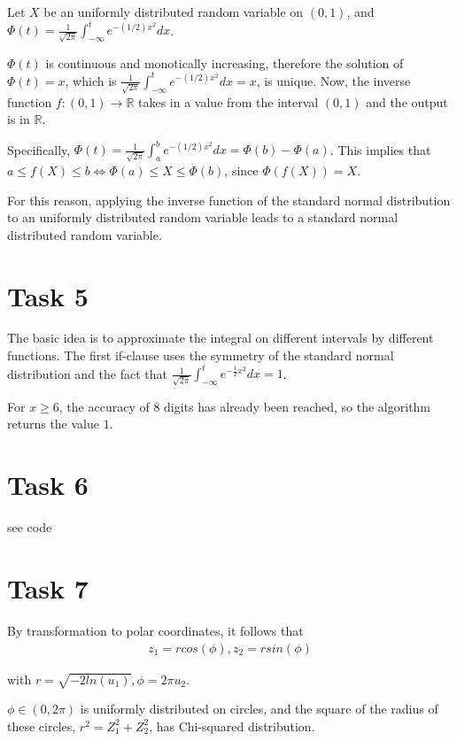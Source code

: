 \documentclass[10pt,a4paper]{article}
\begin{document}
Let $X$ be an uniformly distributed random variable on $(0,1)$, and $\Phi(t)=\frac{1}{\sqrt{2 \pi}}\int_{-\infty}^{t}e^{-(1/2)x^2}dx$.
 
$\Phi(t)$ is continuous and monotically increasing, therefore the solution of $\Phi(t)=x$, which is $\frac{1}{\sqrt{2 \pi}}\int_{-\infty}^{t}e^{-(1/2)x^2}dx=x$, is unique. Now, the inverse function $f:(0,1)\rightarrow \mathbb{R}$ takes in a value from the interval $(0,1)$ and the output is in $\mathbb{R}$.

Specifically, $\Phi(t)=\frac{1}{\sqrt{2 \pi}}\int_{a}^{b}e^{-(1/2)x^2}dx=\Phi(b)-\Phi(a)$. This implies that $a\leq f(X) \leq b \Leftrightarrow \Phi(a)\leq X \leq \Phi(b)$, since $\Phi(f(X))=X$.

For this reason, applying the inverse function of the standard normal distribution to an uniformly distributed random variable leads to a standard normal distributed random variable.  

\section*{Task 5}

The basic idea is to approximate the integral on different intervals by different functions. The first if-clause uses the symmetry of the standard normal distribution and the fact that $\frac{1}{\sqrt{2 \pi}}\int_{-\infty}^{t}e^{-\frac{1}{2}x^2}dx=1$. 

For $x\geq 6$, the accuracy of $8$ digits has already been reached, so the algorithm returns the value $1$.

\section*{Task 6}

see code

\section*{Task 7}

By transformation to polar coordinates, it follows that
\begin{align*}
	z_1=r cos(\phi), z_2=r sin(\phi)
\end{align*}   

with $r=\sqrt{-2ln(u_1)}, \phi=2\pi u_2$. 

$\phi\in (0,2\pi)$ is uniformly distributed on circles, and the square of the radius of these circles, $r^2=Z_1^2+Z_2^2$, has Chi-squared distribution.
\end{document}
